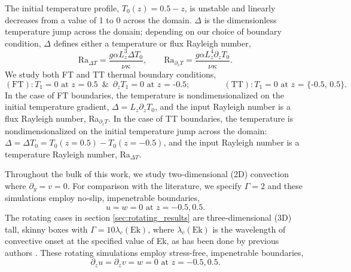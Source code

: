\documentclass[aps, pre, onecolumn, nofootinbib, notitlepage, groupedaddress, amsfonts, amssymb, amsmath, longbibliography, superscriptaddress]{revtex4-1}
\begin{document}
The initial temperature profile, $T_0(z) = 0.5 - z$, is unstable and linearly decreases from a value of 1 to 0 across the domain. 
$\Delta$ is the dimensionless temperature jump across the domain; depending on our choice of boundary condition, $\Delta$ defines either a temperature or flux Rayleigh number,
\begin{equation}
\text{Ra}_{\Delta T} = \frac{g \alpha L_z^3 \Delta T_0}{\nu\kappa}, \qquad 
\text{Ra}_{\partial_z T} = \frac{g \alpha L_z^4 \partial_z T_0}{\nu\kappa}.
\end{equation}
We study both FT and TT thermal boundary conditions,
\begin{equation}
(\text{FT}): T_1 = 0 \text{ at $z$ = 0.5} \,\,\,\&\,\,\, \partial_z T_1 = 0 \text{ at $z$ = -0.5};\qquad\qquad
(\text{TT}): T_1 = 0 \text{ at $z$ = \{-0.5, 0.5\}}.
\end{equation}
In the case of FT boundaries, the temperature is nondimensionalized on the initial temperature gradient, $\Delta = L_z \partial_z T_0$, and the input Rayleigh number is a flux Rayleigh number, Ra$_{\partial_z T}$.
In the case of TT boundaries, the temperature is nondimensionalized on the initial temperature jump across the domain: $\Delta = \Delta T_0 =  T_0(z=0.5)-T_0(z=-0.5)$, and the input Rayleigh number is a temperature Rayleigh number, Ra$_{\Delta T}$.



Throughout the bulk of this work, we study two-dimensional (2D) convection where $\partial_y = v = 0$.
For comparison with the literature, we specify $\Gamma = 2$ and these simulations employ no-slip, impenetrable boundaries,
\begin{equation}
u = w = 0 \, \, \text{at}\,\,z = -0.5, 0.5.
\label{eqn:vel_bcs}
\end{equation}
The rotating cases in section \ref{sec:rotating_results} are three-dimensional (3D) tall, skinny boxes with $\Gamma = 10\lambda_c(\text{Ek})$, where $\lambda_c(\text{Ek})$ is the wavelength of convective onset at the specified value of Ek, as has been done by previous authors \cite{stellmach&all2014}. 
These rotating simulations employ stress-free, impenetrable boundaries,
\begin{equation}
\partial_z u = \partial_z v = w = 0 \, \, \text{at}\,\,z = -0.5, 0.5.
\label{eqn:vel_bcs}
\end{equation}
\end{document}
